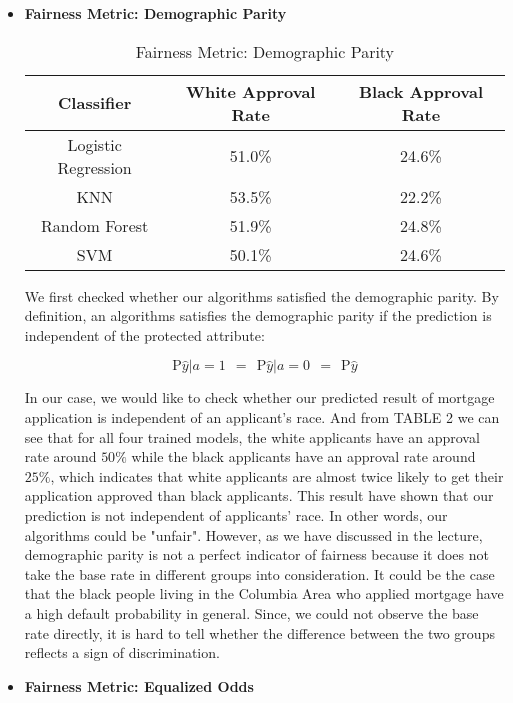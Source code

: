 \documentclass[letterpaper, 10 pt, conference]{ieeeconf}  %
\begin{document}
\begin{itemize}
\item \textbf{Fairness Metric: Demographic Parity} 

\begin{table}[h]
\centering
\caption{Fairness Metric: Demographic Parity}
\begin{tabular}{|c|c|c|}
\hline
Classifier & White Approval Rate & Black Approval Rate \\\hline
Logistic Regression & 51.0\% & 24.6\%\\\hline
KNN &  53.5\% & 22.2\%\\\hline
Random Forest & 51.9\% & 24.8\%\\\hline
SVM &  50.1\% & 24.6\%\\\hline
\end{tabular}
\end{table}
We first checked whether our algorithms satisfied the demographic parity. By definition, an algorithms satisfies the demographic parity if the prediction is independent of the protected attribute:

\begin{equation}
    \mathrm{P} \hat{y}|a=1 \ \ =\ \ \mathrm{P}\hat{y}|a=0\ \ =\ \ \mathrm{P
    }\hat{y}
\end{equation}

In our case, we would like to check whether our predicted result of mortgage application is independent of an applicant's race. And from TABLE 2 we can see that for all four trained models, the white applicants have an approval rate around $50\%$ while the black applicants have an approval rate around $25\%$, which indicates that white applicants are almost twice likely to get their application approved than black applicants. This result have shown that our prediction is not independent of applicants' race. In other words, our algorithms could be "unfair". However, as we have discussed in the lecture, demographic parity is not a perfect indicator of fairness because it does not take the base rate in different groups into consideration. It could be the case that the black people living in the Columbia Area who applied mortgage have a high default probability in general. Since, we could not observe the base rate directly, it is hard to tell whether the difference between the two groups reflects a sign of discrimination.



\item \textbf{Fairness Metric: Equalized Odds} 


\end{itemize}
\end{document}
